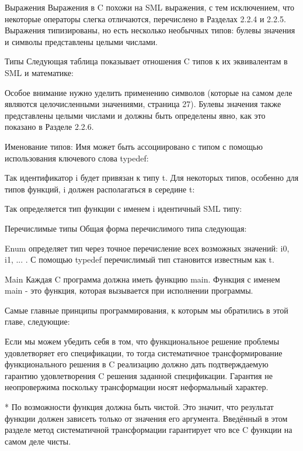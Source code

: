 
Выражения Выражения в C похожи на SML выражения, с тем исключением, что некоторые операторы слегка отличаются, перечислено в Разделах 2.2.4 и 2.2.5. Выражения типизированы, но есть несколько необычных типов: булевы значения и символы представлены целыми числами.

Типы Следующая таблица показывает отношения C типов к их эквивалентам в SML и математике:

Особое внимание нужно уделить применению символов (которые на самом деле являются целочисленными значениями, страница 27). Булевы значения также представлены целыми числами и должны быть определены явно, как это показано в Разделе 2.2.6.

Именование типов: Имя может быть ассоциировано с типом с помощью использования ключевого слова typedef:

Так идентификатор i будет привязан к типу t. Для некоторых типов, особенно для типов функций, i должен располагаться в середине t:

Так определяется тип функции с именем i идентичный SML типу:

Перечислимые типы Общая форма перечислимого типа следующая:

Enum определяет тип через точное перечисление всех возможных значений: i0, i1, ... . С помощью typedef перечислимый тип становится известным как t.

Main Каждая C программа должна иметь функцию main. Функция с именем main - это функция, которая вызывается при исполнении программы.

Самые главные принципы программирования, к которым мы обратились в этой главе, следующие:

Если мы можем убедить себя в том, что функциональное решение проблемы удовлетворяет его спецификации, то тогда систематичное трансформирование функционального решения в C реализацию должно дать подтверждаемую гарантию удовлетворения C решения заданной спецификации. Гарантия не неопровержима поскольку трансформации носят неформальный характер.

* По возможности функция должна быть чистой. Это значит, что результат функции должен зависеть только от значения его аргумента. Введённый в этом разделе метод систематичной трансформации гарантирует что все C функции на самом деле чисты.

